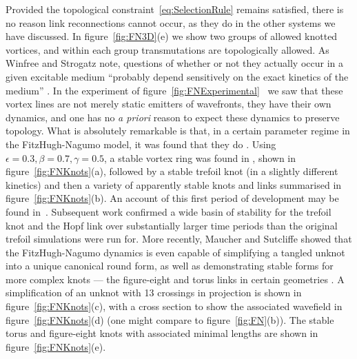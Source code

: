 Provided the topological constraint~\eqref{eq:SelectionRule} remains satisfied, there is no reason link reconnections cannot occur, as they do in the other systems we have discussed. In figure~\ref{fig:FN3D}(e) we show two groups of allowed knotted vortices, and within each group transmutations are topologically allowed. As Winfree and Strogatz note, questions of whether or not they actually occur in a given excitable medium ``probably depend sensitively on the exact kinetics of the medium'' \citep{Winfree1984}. In the experiment of figure~\ref{fig:FNExperimental}~\citep{Totz2015} we saw that these vortex lines are not merely static emitters of wavefronts, they have their own dynamics, and one has no \emph{a priori} reason to expect these dynamics to preserve topology. What is absolutely remarkable is that, in a certain parameter regime in the FitzHugh-Nagumo model, it was found that they do \citep{Winfree1990,Henze1993}. Using $\epsilon = 0.3, \beta = 0.7, \gamma=0.5$, a stable vortex ring was found in \citep{Courtemanche1990}, shown in figure~\ref{fig:FNKnots}(a), followed by a stable trefoil knot \citep{Henze1991}(in a slightly different kinetics) and then a variety of apparently stable knots and links \citep{Henze1993} summarised in figure~\ref{fig:FNKnots}(b). An account of this first period of development may be found in~\citep{Winfree1990, WinfreeBook,WinfreeChapter}. Subsequent work \citep{Sutcliffe2003} confirmed a wide basin of stability for the trefoil knot and the Hopf link over substantially larger time periods than the original trefoil simulations were run for. More recently, Maucher and Sutcliffe \citep{Maucher2016} showed that the FitzHugh-Nagumo dynamics is even capable of simplifying a tangled unknot into a unique canonical round form, as well as demonstrating stable forms for more complex knots --- the figure-eight and torus links in certain geometries \citep{Maucher2017}. A simplification of an unknot with 13 crossings in projection is shown in figure~\ref{fig:FNKnots}(c), with a cross section to show the associated wavefield in figure~\ref{fig:FNKnots}(d) (one might compare to figure~\ref{fig:FN}(b)). The stable torus and figure-eight knots with associated minimal lengths are shown in figure~\ref{fig:FNKnots}(e).
